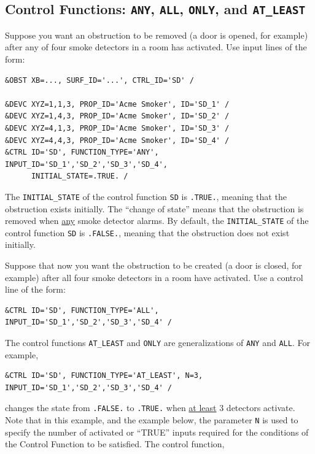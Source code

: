 \documentclass[11pt]{book}
\newcommand{\ct}{\tt\small}
\begin{document}
\subsection{Control Functions: \texorpdfstring{{\tt ANY}}{ANY}, \texorpdfstring{{\tt ALL}}{ALL}, \texorpdfstring{{\tt ONLY}}{ONLY}, and
\texorpdfstring{{\tt AT\_LEAST}}{AT\_LEAST}}

\label{info:FUNCTION_TYPE}

Suppose you want an obstruction to be removed (a door is opened, for example) after any
of four smoke detectors in a room has activated. Use input lines of the form:

\footnotesize
\begin{verbatim}
&OBST XB=..., SURF_ID='...', CTRL_ID='SD' /

&DEVC XYZ=1,1,3, PROP_ID='Acme Smoker', ID='SD_1' /
&DEVC XYZ=1,4,3, PROP_ID='Acme Smoker', ID='SD_2' /
&DEVC XYZ=4,1,3, PROP_ID='Acme Smoker', ID='SD_3' /
&DEVC XYZ=4,4,3, PROP_ID='Acme Smoker', ID='SD_4' /
&CTRL ID='SD', FUNCTION_TYPE='ANY', INPUT_ID='SD_1','SD_2','SD_3','SD_4',
      INITIAL_STATE=.TRUE. /
\end{verbatim}
\normalsize

\noindent
The {\ct INITIAL\_STATE} of the control function {\ct SD} is {\ct .TRUE.},
meaning that the obstruction exists initially. The ``change of state'' means that the obstruction is
removed when \underline{any} smoke detector alarms.  By default, the {\ct INITIAL\_STATE}
of the control function {\ct SD} is {\ct .FALSE.}, meaning that the obstruction does not exist initially.

Suppose that now you want the obstruction to be created (a door is closed, for example) after all
four smoke detectors in a room have activated. Use a control line of the form:

\footnotesize
\begin{verbatim}
&CTRL ID='SD', FUNCTION_TYPE='ALL', INPUT_ID='SD_1','SD_2','SD_3','SD_4' /
\end{verbatim}
\normalsize

\noindent
The control functions {\ct AT\_LEAST} and {\ct ONLY} are generalizations of {\ct ANY} and {\ct ALL}. For example,

\footnotesize
\begin{verbatim}
&CTRL ID='SD', FUNCTION_TYPE='AT_LEAST', N=3, INPUT_ID='SD_1','SD_2','SD_3','SD_4' /
\end{verbatim}

\normalsize
\noindent
changes the state from {\ct .FALSE.} to {\ct .TRUE.} when \underline{at least}
3 detectors activate. Note that in this example, and the example below, the parameter {\ct N} is used to
specify the number of activated or ``TRUE'' inputs required for the conditions
of the Control Function to be satisfied. The control function,
\end{document}
